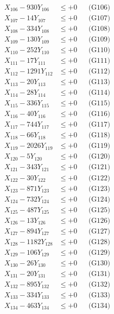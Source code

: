 \documentclass[a4paper,10pt]{article}
\begin{document}
{\begin{align}
X_{106} - 930Y_{106} &\leq +0 && \text{(G106)} \\
X_{107} - 14Y_{107} &\leq +0 && \text{(G107)} \\
X_{108} - 334Y_{108} &\leq +0 && \text{(G108)} \\
X_{109} - 130Y_{109} &\leq +0 && \text{(G109)} \\
X_{110} - 252Y_{110} &\leq +0 && \text{(G110)} \\
\allowbreak
X_{111} - 17Y_{111} &\leq +0 && \text{(G111)} \\
X_{112} - 1291Y_{112} &\leq +0 && \text{(G112)} \\
X_{113} - 20Y_{113} &\leq +0 && \text{(G113)} \\
X_{114} - 28Y_{114} &\leq +0 && \text{(G114)} \\
X_{115} - 336Y_{115} &\leq +0 && \text{(G115)} \\
X_{116} - 40Y_{116} &\leq +0 && \text{(G116)} \\
X_{117} - 744Y_{117} &\leq +0 && \text{(G117)} \\
X_{118} - 66Y_{118} &\leq +0 && \text{(G118)} \\
X_{119} - 2026Y_{119} &\leq +0 && \text{(G119)} \\
X_{120} - 5Y_{120} &\leq +0 && \text{(G120)} \\
\allowbreak
X_{121} - 343Y_{121} &\leq +0 && \text{(G121)} \\
X_{122} - 30Y_{122} &\leq +0 && \text{(G122)} \\
X_{123} - 871Y_{123} &\leq +0 && \text{(G123)} \\
X_{124} - 732Y_{124} &\leq +0 && \text{(G124)} \\
X_{125} - 487Y_{125} &\leq +0 && \text{(G125)} \\
X_{126} - 13Y_{126} &\leq +0 && \text{(G126)} \\
X_{127} - 894Y_{127} &\leq +0 && \text{(G127)} \\
X_{128} - 1182Y_{128} &\leq +0 && \text{(G128)} \\
X_{129} - 106Y_{129} &\leq +0 && \text{(G129)} \\
X_{130} - 26Y_{130} &\leq +0 && \text{(G130)} \\
\allowbreak
X_{131} - 20Y_{131} &\leq +0 && \text{(G131)} \\
X_{132} - 895Y_{132} &\leq +0 && \text{(G132)} \\
X_{133} - 334Y_{133} &\leq +0 && \text{(G133)} \\
X_{134} - 463Y_{134} &\leq +0 && \text{(G134)} \\

\end{align}}
\end{document}
